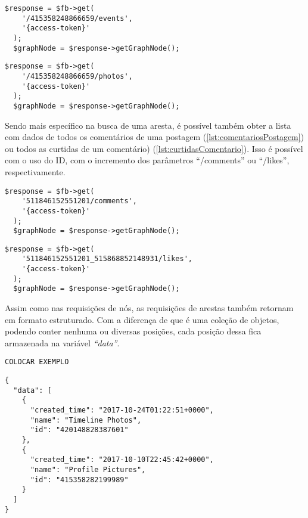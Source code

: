 \begin{lstlisting}[caption={Requisitar os eventos agendados pela página},label={lst:eventosPagina}]
  $response = $fb->get( 
    '/415358248866659/events', 
    '{access-token}'
  );
  $graphNode = $response->getGraphNode();
\end{lstlisting}


\begin{lstlisting}[caption={Requisitar as fotos de perfil publicadas na página},label={lst:fotosPagina}]
  $response = $fb->get( 
    '/415358248866659/photos', 
    '{access-token}'
  );
  $graphNode = $response->getGraphNode();
\end{lstlisting}

Sendo mais específico na busca de uma aresta, é possível também obter a lista com dados de todos os comentários de uma postagem (\ref{lst:comentariosPostagem}) ou todos as curtidas de um comentário) (\ref{lst:curtidasComentario}). Isso é possível com o uso do ID, com o incremento dos parâmetros ``/comments'' ou ``/likes'', respectivamente.

\begin{lstlisting}[caption={Requisitar todos os comentários de uma postagem em uma página},label={lst:comentariosPostagem}]
  $response = $fb->get( 
    '511846152551201/comments', 
    '{access-token}'
  );
  $graphNode = $response->getGraphNode();
\end{lstlisting}

\begin{lstlisting}[caption={Requisitar todas as curtidas de um comentário},label={lst:curtidasComentario}]
  $response = $fb->get( 
    '511846152551201_515868852148931/likes', 
    '{access-token}'
  );
  $graphNode = $response->getGraphNode();
\end{lstlisting}

Assim como nas requisições de nós, as requisições de arestas também retornam em formato estruturado. Com a diferença de que é uma coleção de objetos, podendo conter nenhuma ou diversas posições, cada posição dessa fica armazenada na variável \textit{``data''}.

\begin{lstlisting}[caption={Resposta da requisição \ref{lst:feedUsuario} (Feed)},label={lst:respostaFeed}]
COLOCAR EXEMPLO
\end{lstlisting} 

\begin{lstlisting}[caption={Resposta das requisições \ref{lst:albunsPagina}, \ref{lst:fotosPagina} e \ref{lst:videosPagina}  (Álbuns, Fotos e Videos)},label={lst:respostaAlbuns}]
{
  "data": [
    {
      "created_time": "2017-10-24T01:22:51+0000",
      "name": "Timeline Photos",
      "id": "420148828387601"
    },
    {
      "created_time": "2017-10-10T22:45:42+0000",
      "name": "Profile Pictures",
      "id": "415358282199989"
    }
  ]
}
\end{lstlisting}

